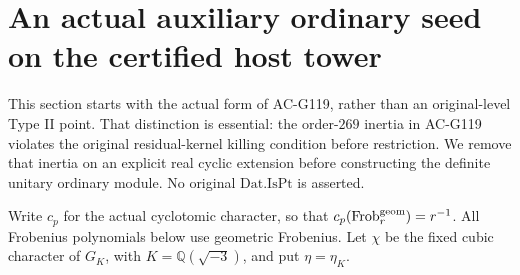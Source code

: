 \section{An actual auxiliary ordinary seed on the certified host tower}
\label{sec:cubic-auxiliary-host-seed}

This section starts with the actual form of AC-G119, rather than an
original-level Type II point.  That distinction is essential: the
order-$269$ inertia in AC-G119 violates the original residual-kernel
killing condition before restriction.  We remove that inertia on an
explicit real cyclic extension before constructing the definite
unitary ordinary module.  No original $\mathrm{Dat.IsPt}$ is asserted.

Write $c_p$ for the actual cyclotomic character, so that
$c_p(\operatorname{Frob}^{\rm geom}_r)=r^{-1}$.
All Frobenius polynomials below use geometric Frobenius.
Let $\chi$ be the fixed cubic character of $G_K$, with
$K=\mathbb Q(\sqrt{-3})$, and put $\eta=\eta_K$.


